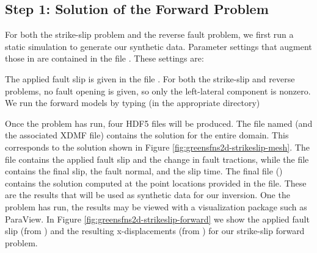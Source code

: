 \subsection{Step 1: Solution of the Forward Problem}

For both the strike-slip problem and the reverse fault problem, we
first run a static simulation to generate our synthetic
data. Parameter settings that augment those in
 are contained in the file
. These settings are:
\begin{inventory}
\end{inventory}
The applied fault slip is given in the file
.  For both the strike-slip and reverse
problems, no fault opening is given, so only the left-lateral
component is nonzero. We run the forward models by typing (in the
appropriate directory)
Once the problem has run, four HDF5 files will be produced. The file
named  (and the associated XDMF file) contains the
solution for the entire domain. This corresponds to the solution shown
in Figure \vref{fig:greensfns2d-strikeslip-mesh}. The
 file contains the applied fault slip and the
change in fault tractions, while the 
file contains the final slip, the fault normal, and the slip time. The
final file () contains the solution computed
at the point locations provided in the 
file. These are the results that will be used as synthetic data for
our inversion. One the problem has run, the results may be viewed with
a visualization package such as ParaView.  In Figure
\vref{fig:greensfns2d-strikeslip-forward} we show the applied fault
slip (from ) and the resulting
x-displacements (from ) for our strike-slip
forward problem.

